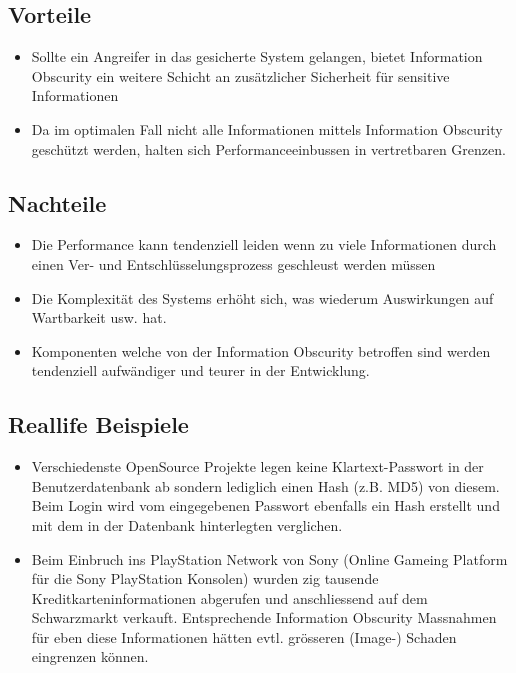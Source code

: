 \subsection*{Vorteile}
\begin{itemize}
	\item Sollte ein Angreifer in das gesicherte System gelangen, bietet Information Obscurity ein weitere Schicht an zusätzlicher Sicherheit für sensitive Informationen
	\item Da im optimalen Fall nicht alle Informationen mittels Information Obscurity geschützt werden, halten sich Performanceeinbussen in vertretbaren Grenzen.
\end{itemize}

\subsection*{Nachteile}
\begin{itemize}
	\item Die Performance kann tendenziell leiden wenn zu viele Informationen durch einen Ver- und Entschlüsselungsprozess geschleust werden müssen
	\item Die Komplexität des Systems erhöht sich, was wiederum Auswirkungen auf Wartbarkeit usw. hat.
	\item Komponenten welche von der Information Obscurity betroffen sind werden tendenziell aufwändiger und teurer in der Entwicklung.
\end{itemize}

\subsection*{Reallife Beispiele}
\begin{itemize}
	\item Verschiedenste OpenSource Projekte legen keine Klartext-Passwort in der Benutzerdatenbank ab sondern lediglich einen Hash (z.B. MD5) von diesem. Beim Login wird vom eingegebenen Passwort ebenfalls ein Hash erstellt und mit dem in der Datenbank hinterlegten verglichen.
	\item Beim Einbruch ins PlayStation Network von Sony (Online Gameing Platform für die Sony PlayStation Konsolen) wurden zig tausende Kreditkarteninformationen abgerufen und anschliessend auf dem Schwarzmarkt verkauft. Entsprechende Information Obscurity Massnahmen für eben diese Informationen hätten evtl. grösseren (Image-) Schaden eingrenzen können.
\end{itemize}

